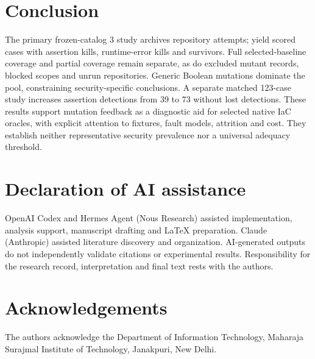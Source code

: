 \section{Conclusion}\label{sec:conclusion}
The primary frozen-catalog 3 study archives \ArchivedRepos{} repository attempts; \ScoredRepos{} yield \NScored{} scored cases with \AssertionKills{} assertion kills, \RuntimeKills{} runtime-error kills and \Survivors{} survivors. Full selected-baseline coverage and partial coverage remain separate, as do \ExcludedCases{} excluded mutant records, blocked scopes and unrun repositories. Generic Boolean mutations dominate the pool, constraining security-specific conclusions. A separate matched 123-case study increases assertion detections from 39 to 73 without lost detections. These results support mutation feedback as a diagnostic aid for selected native IaC oracles, with explicit attention to fixtures, fault models, attrition and cost. They establish neither representative security prevalence nor a universal adequacy threshold.

\section*{Declaration of AI assistance}
OpenAI Codex and Hermes Agent (Nous Research) assisted implementation, analysis support, manuscript drafting and LaTeX preparation. Claude (Anthropic) assisted literature discovery and organization. AI-generated outputs do not independently validate citations or experimental results. Responsibility for the research record, interpretation and final text rests with the authors.

\section*{Acknowledgements}
The authors acknowledge the Department of Information Technology, Maharaja Surajmal Institute of Technology, Janakpuri, New Delhi.

\label{lastmanuscriptpage}
\ifdefined\IncludeResponses
\clearpage

\fi

